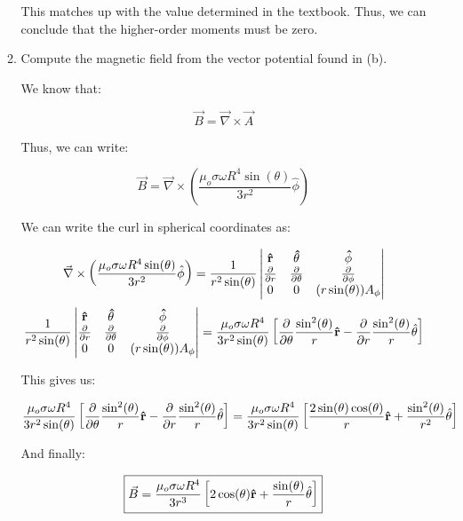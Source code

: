 \begin{enumerate}
\begin{enumerate}
        This matches up with the value determined in the textbook. Thus, we can conclude that the higher-order moments must be zero.

      \item Compute the magnetic field from the vector potential found in (b).

        We know that:

        $$\vec{B}=\vec{\nabla}\times\vec{A}$$

        Thus, we can write:

        $$\vec{B}=\vec{\nabla}\times\left( \frac{\mu_o\sigma\omega R^4\sin(\theta)}{3r^2}\hat{\phi} \right)$$

        We can write the curl in spherical coordinates as:

        $$\vec{\nabla}\times\left( \frac{\mu_o\sigma\omega R^4\sin(\theta)}{3r^2}\hat{\phi} \right)=\frac{1}{r^2\sin(\theta)}\left|\begin{matrix} \bold{\hat{r}} & \bold{\hat{\theta}} & \bold{\hat{\phi}}\\ \frac{\partial}{\partial r} & \frac{\partial}{\partial \theta} & \frac{\partial}{\partial \phi} \\ 0 & 0 & (r\sin(\theta))A_\phi \end{matrix}\right|$$
        $$\frac{1}{r^2\sin(\theta)}\left|\begin{matrix} \bold{\hat{r}} & \bold{\hat{\theta}} & \bold{\hat{\phi}}\\ \frac{\partial}{\partial r} & \frac{\partial}{\partial \theta} & \frac{\partial}{\partial \phi} \\ 0 & 0 & (r\sin(\theta))A_\phi \end{matrix}\right|=\frac{\mu_o\sigma\omega R^4}{3r^2\sin(\theta)}\left[\frac{\partial}{\partial\theta}\frac{\sin^2(\theta)}{r}\bold{\hat{r}}- \frac{\partial}{\partial r}\frac{\sin^2(\theta)}{r}\hat{\theta}\right]$$

        This gives us:

        $$\frac{\mu_o\sigma\omega R^4}{3r^2\sin(\theta)}\left[\frac{\partial}{\partial\theta}\frac{\sin^2(\theta)}{r}\bold{\hat{r}}- \frac{\partial}{\partial r}\frac{\sin^2(\theta)}{r}\hat{\theta}\right]=\frac{\mu_o\sigma\omega R^4}{3r^2\sin(\theta)}\left[\frac{2\sin(\theta)\cos(\theta)}{r}\bold{\hat{r}}+\frac{\sin^2(\theta)}{r^2}\hat{\theta}\right]$$

        And finally:

        $$\boxed{\vec{B}=\frac{\mu_o\sigma\omega R^4}{3r^3}\left[2\cos(\theta)\bold{\hat{r}}+\frac{\sin(\theta)}{r}\hat{\theta}\right]}$$


\end{enumerate}
\end{enumerate}
